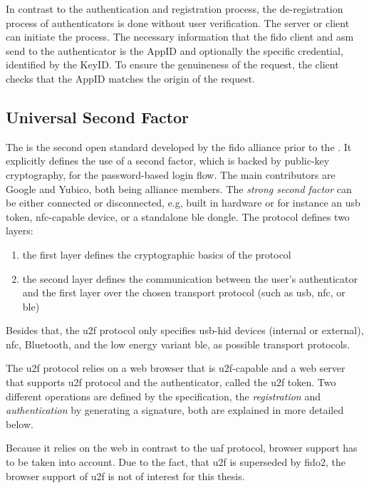 In contrast to the authentication and registration process, the de-registration process of authenticators is done without user verification. The server or client can initiate the process. The necessary information that the \gls{fido} client and \gls{asm} send to the authenticator is the AppID and optionally the specific credential, identified by the KeyID. To ensure the genuineness of the request, the client checks that the AppID matches the origin of the request.

\subsection{Universal Second Factor}

The  is the second open standard developed by the \gls{fido} alliance prior to the \wa. It explicitly defines the use of a second factor, which is backed by public-key cryptography, for the password-based login flow. The main contributors are Google and Yubico, both being alliance members. The \textit{strong second factor} can be either connected or disconnected, e.g, built in hardware or for instance an \gls{usb} token, \gls{nfc}-capable device, or a standalone \gls{ble} dongle. The protocol defines two layers:

\begin{enumerate}
	\item the first layer defines the cryptographic basics of the protocol
	\item the second layer defines the communication between the user's authenticator and the first layer over the chosen transport protocol (such as \gls{usb}, \gls{nfc}, or \gls{ble})
\end{enumerate}

Besides that, the \gls{u2f} protocol only specifies \gls{usb}-\gls{hid} devices (internal or external), \gls{nfc}, Bluetooth, and the low energy variant \gls{ble}, as possible transport protocols.

The \gls{u2f} protocol relies on a web browser that is \gls{u2f}-capable and a web server that supports \gls{u2f} protocol and the authenticator, called the \gls{u2f} token. Two different operations are defined by the specification, the \textit{registration} and \textit{authentication} by generating a signature, both are explained in more detailed below.

Because it relies on the web in contrast to the \gls{uaf} protocol, browser support has to be taken into account. Due to the fact, that \gls{u2f} is superseded by \gls{fido}2, the browser support of \gls{u2f} is not of interest for this thesis.

